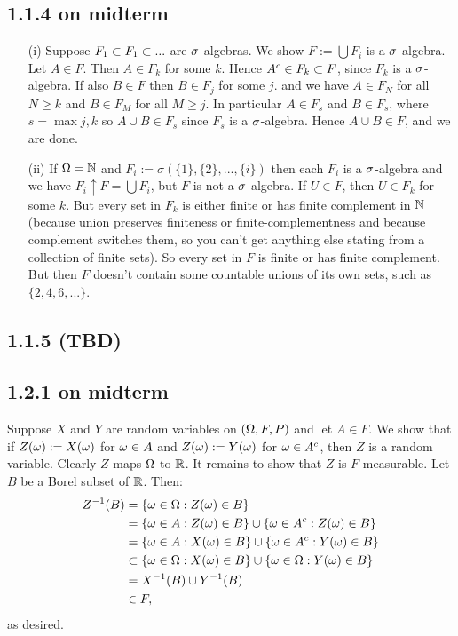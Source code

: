 \documentclass[11pt]{article}
\begin{document}
\subsection*{1.1.4 on midterm}
 \begin{enumerate}
    \item[(i)] Suppose $F_1 \subset F_1 \subset ...$ are $\sigma$-algebras. We show $F := \bigcup F_i$ is a $\sigma$-algebra. Let $A \in F$. Then $A \in F_k$ for some $k$. Hence $A^c \in F_k \subset F$, since $F_k$ is a $\sigma$-algebra. If also $B \in F$ then $B \in F_j$ for some $j$. and we have $A \in F_N$ for all $N \geq k$ and $B \in F_M$ for all $M \geq j$. In particular $A \in F_s$ and $B \in F_s$, where $s = \max{j,k}$ so $A \cup B \in  F_s$ since $F_s$ is a $\sigma$-algebra. Hence $A \cup B \in F$, and we are done.
    \item[(ii)] If $\Omega = {\mathbb N}$ and $F_i := \sigma(\{1\},\{2\},...,\{i\})$ then each $F_i$ is a $\sigma$-algebra and we have $F_i\uparrow F=\bigcup F_i$, but $F$ is not a $\sigma$-algebra. If $U \in F$, then $U \in F_k$ for some $k$. But every set in $F_k$ is either finite or has finite complement in ${\mathbb N}$ (because union preserves finiteness or finite-complementness and because complement switches them, so you can't get anything else stating from a collection of finite sets). So every set in $F$ is finite or has finite complement. But then $F$ doesn't contain some countable unions of its own sets, such as $\{2,4,6,...\}$.
 \end{enumerate}

\subsection*{1.1.5 (TBD)}

\subsection*{1.2.1 on midterm}

Suppose $X$ and $Y$ are random variables on $(\Omega,F, P)$ and let $A \in F$. We show that if $Z(\omega) := X(\omega)$ for $\omega \in A$ and $Z(\omega) := Y(\omega)$ for $\omega \in A^c$, then $Z$ is a random variable. Clearly $Z$ maps $\Omega$ to ${\mathbb R}$. It remains to show that $Z$ is $F$-measurable. Let $B$ be a Borel subset of ${\mathbb R}$. Then: \begin{align*}
    Z^{-1}(B) &= \{\omega \in \Omega : Z(\omega) \in B\} \\
    &= \{\omega \in A : Z(\omega) \in B\}\cup \{\omega \in A^c : Z(\omega) \in B\} \\
    &= \{\omega \in A : X(\omega) \in B\}\cup \{\omega \in A^c : Y(\omega) \in B\} \\
    &\subset \{\omega \in \Omega : X(\omega) \in B\}\cup \{\omega \in \Omega : Y(\omega) \in B\} \\
    &= X^{-1}(B) \cup Y^{-1}(B) \\
    & \in F,
\end{align*} as desired.
\end{document}
